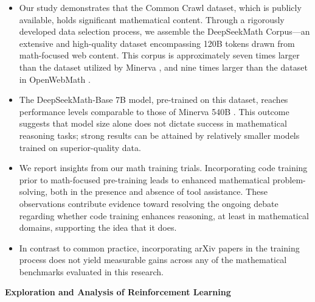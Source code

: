 \begin{itemize}[topsep=0pt]
    \item Our study demonstrates that the Common Crawl dataset, which is publicly available, holds significant mathematical content. Through a rigorously developed data selection process, we assemble the DeepSeekMath Corpus—an extensive and high-quality dataset encompassing 120B tokens drawn from math-focused web content. This corpus is approximately seven times larger than the dataset utilized by Minerva \citep{minerva}, and nine times larger than the dataset in OpenWebMath \citep{openwebmath}.

    \item The DeepSeekMath-Base 7B model, pre-trained on this dataset, reaches performance levels comparable to those of Minerva 540B \citep{minerva}. This outcome suggests that model size alone does not dictate success in mathematical reasoning tasks; strong results can be attained by relatively smaller models trained on superior-quality data.

    \item We report insights from our math training trials. Incorporating code training prior to math-focused pre-training leads to enhanced mathematical problem-solving, both in the presence and absence of tool assistance. These observations contribute evidence toward resolving the ongoing debate regarding whether code training enhances reasoning, at least in mathematical domains, supporting the idea that it does.

    \item In contrast to common practice, incorporating arXiv papers in the training process does not yield measurable gains across any of the mathematical benchmarks evaluated in this research.
\end{itemize}

\textbf{Exploration and Analysis of Reinforcement Learning}

